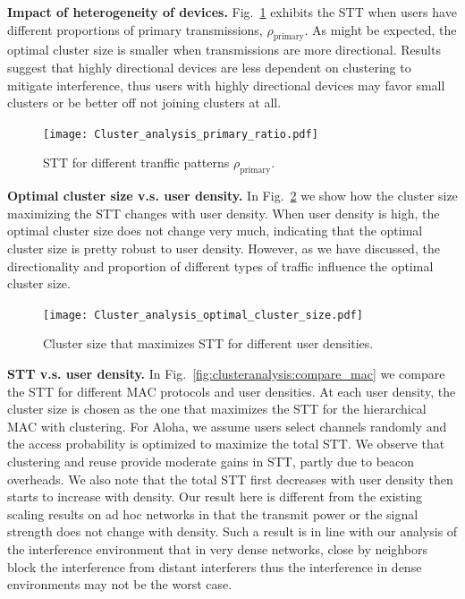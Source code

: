 \documentclass[10pt, conference, letterpaper]{IEEEtran}
\begin{document}
\textbf{Impact of heterogeneity of devices.} Fig.~\ref{fig:clusteranalysis:primary_ratio} exhibits the STT when users have different proportions of primary transmissions, $\rho_{\mathrm{primary}}$.
As might be expected, the optimal cluster size is smaller when transmissions are more directional. 
Results suggest that highly directional devices are less dependent on clustering to mitigate interference, thus users with highly directional devices may favor small clusters or be better off not joining clusters at all. 


\begin{figure}
	\centering
	\texttt{[image: Cluster\_analysis\_primary\_ratio.pdf]}
	\caption{STT for different tranffic patterns $\rho_{\mathrm{primary}}$.}
	\label{fig:clusteranalysis:primary_ratio}
\end{figure}

\textbf{Optimal cluster size v.s. user density.} In Fig.~\ref{fig:clustereanalysis:optimal_cluster_size} we show how the cluster size maximizing the STT changes with user density. 
When user density is high, the optimal cluster size does not change very much, indicating that the optimal cluster size is pretty robust to user density. 
However, as we have discussed, the directionality and proportion of different types of traffic influence the optimal cluster size. 

\begin{figure}
	\centering
	\texttt{[image: Cluster\_analysis\_optimal\_cluster\_size.pdf]}
	\caption{Cluster size that maximizes STT for different user densities.}
	\label{fig:clustereanalysis:optimal_cluster_size}
\end{figure}

\textbf{STT v.s. user density.} In Fig.~\ref{fig:clusteranalysis:compare_mac} we compare the STT for different MAC protocols and user densities. 
At each user density, the cluster size is chosen as the one that maximizes the STT for the hierarchical MAC with clustering. 
For Aloha, we assume users select channels randomly and the access probability is optimized to maximize the total STT. 
We observe that clustering and reuse provide moderate gains in STT, partly due to beacon overheads. %
We also note that the total STT first decreases with user density then starts to increase with density.
Our result here is different from the existing scaling results on ad hoc networks in that the transmit power or the signal strength does not change with density.
Such a result is in line with our analysis of the interference environment that in very dense networks, close by neighbors block the interference from distant interferers thus the interference in dense environments may not be the worst case. 
 
\end{document}

